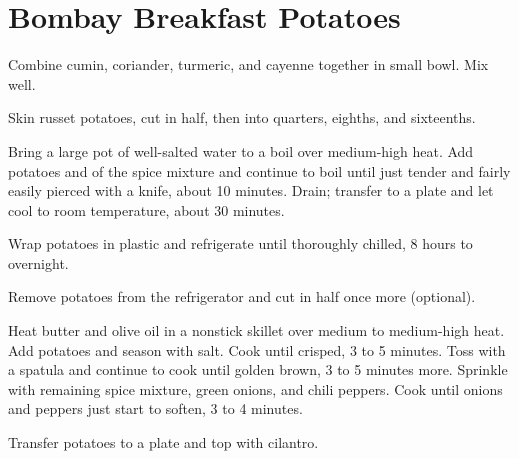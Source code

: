 \section{Bombay Breakfast Potatoes}
\begin{recipe}






	Combine cumin, coriander, turmeric, and cayenne together in small bowl. Mix well.

	Skin russet potatoes, cut in half, then into quarters, eighths, and sixteenths.

	Bring a large pot of well-salted water to a boil over medium-high heat. Add potatoes and  of the spice mixture and continue to boil until just tender and fairly easily pierced with a knife, about 10 minutes. Drain; transfer to a plate and let cool to room temperature, about 30 minutes.

	Wrap potatoes in plastic and refrigerate until thoroughly chilled, 8 hours to overnight.

	Remove potatoes from the refrigerator and cut in half once more (optional).

	Heat butter and olive oil in a nonstick skillet over medium to medium-high heat. Add potatoes and season with salt. Cook until crisped, 3 to 5 minutes. Toss with a spatula and continue to cook until golden brown, 3 to 5 minutes more. Sprinkle with remaining spice mixture, green onions, and chili peppers. Cook until onions and peppers just start to soften, 3 to 4 minutes.

	Transfer potatoes to a plate and top with cilantro.

\end{recipe}
